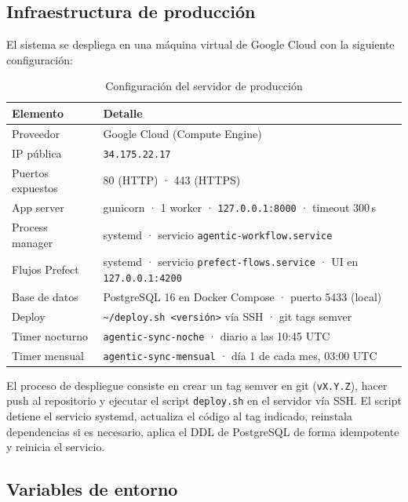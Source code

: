 \documentclass[12pt, a4paper]{article}
\begin{document}
  \subsection{Infraestructura de producción}

  El sistema se despliega en una máquina virtual de Google Cloud con la siguiente
  configuración:

  \begin{table}[H]
  \centering
  \renewcommand{\arraystretch}{1.3}
  \begin{tabular}{ll}
  \toprule
  \textbf{Elemento} & \textbf{Detalle} \\
  \midrule
  Proveedor          & Google Cloud (Compute Engine) \\
  IP pública         & \texttt{34.175.22.17} \\
  Puertos expuestos  & 80 (HTTP) · 443 (HTTPS) \\
  App server         & gunicorn · 1 worker · \texttt{127.0.0.1:8000} · timeout 300\,s \\
  Process manager    & systemd · servicio \texttt{agentic-workflow.service} \\
  Flujos Prefect     & systemd · servicio \texttt{prefect-flows.service} · UI en \texttt{127.0.0.1:4200} \\
  Base de datos      & PostgreSQL 16 en Docker Compose · puerto 5433 (local) \\
  Deploy             & \texttt{\textasciitilde/deploy.sh <versión>} vía SSH · git tags semver \\
  Timer nocturno     & \texttt{agentic-sync-noche} · diario a las 10:45 UTC \\
  Timer mensual      & \texttt{agentic-sync-mensual} · día 1 de cada mes, 03:00 UTC \\
  \bottomrule
  \end{tabular}
  \caption{Configuración del servidor de producción}
  \label{tab:infra}
  \end{table}

  El proceso de despliegue consiste en crear un tag semver en git
  (\texttt{vX.Y.Z}), hacer push al repositorio y ejecutar el script
  \texttt{deploy.sh} en el servidor vía SSH. El script detiene el servicio
  systemd, actualiza el código al tag indicado, reinstala dependencias si es
  necesario, aplica el DDL de PostgreSQL de forma idempotente y reinicia el
  servicio.

  \subsection{Variables de entorno}
\end{document}
